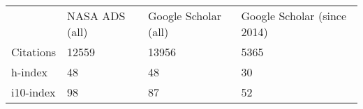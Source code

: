 
\begin{tabularx}{\textwidth}{llll} 
	&NASA ADS (all) & Google Scholar (all) & Google Scholar (since 2014)\\ 
Citations& 12559& 13956&5365\\
h-index & 48 & 48 &30\\
i10-index & 98 &87&52\\
\end{tabularx}
